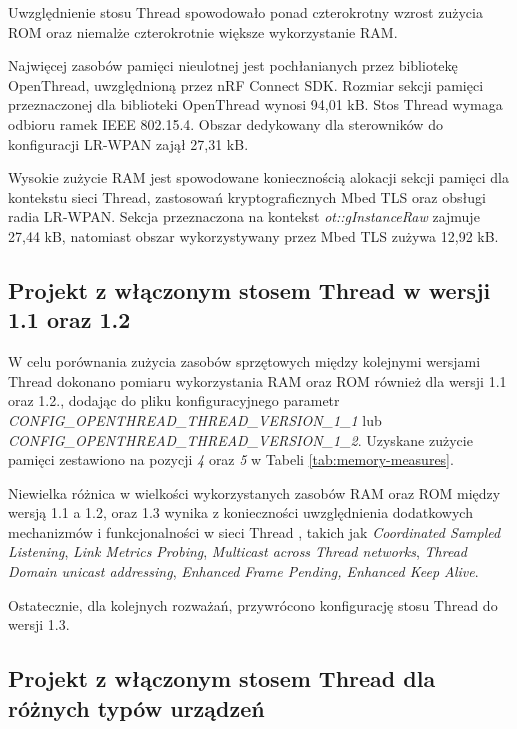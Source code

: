         Uwzględnienie stosu Thread spowodowało ponad czterokrotny wzrost zużycia ROM oraz niemalże czterokrotnie większe wykorzystanie RAM. 
        
        Najwięcej zasobów pamięci nieulotnej jest pochłanianych przez bibliotekę OpenThread, uwzględnioną przez nRF Connect SDK. Rozmiar sekcji pamięci przeznaczonej dla biblioteki OpenThread wynosi 94,01 kB. Stos Thread wymaga odbioru ramek IEEE 802.15.4. Obszar dedykowany dla sterowników do konfiguracji LR-WPAN zajął 27,31 kB.

        Wysokie zużycie RAM jest spowodowane koniecznością alokacji sekcji pamięci dla kontekstu sieci Thread, zastosowań kryptograficznych Mbed TLS oraz obsługi radia LR-WPAN. Sekcja przeznaczona na kontekst \textit{ot::gInstanceRaw} zajmuje 27,44 kB, natomiast obszar wykorzystywany przez Mbed TLS zużywa 12,92 kB.

    \subsection{Projekt z włączonym stosem Thread w wersji 1.1 oraz 1.2}

    W celu porównania zużycia zasobów sprzętowych między kolejnymi wersjami Thread dokonano pomiaru wykorzystania RAM oraz ROM również dla wersji 1.1 oraz 1.2., dodając do pliku konfiguracyjnego parametr \textit{CONFIG\_OPENTHREAD\_THREAD\_VERSION\_1\_1} lub \\ \textit{CONFIG\_OPENTHREAD\_THREAD\_VERSION\_1\_2}. Uzyskane zużycie pamięci zestawiono na pozycji \textit{4} oraz \textit{5} w Tabeli \ref{tab:memory-measures}.

    Niewielka różnica w wielkości wykorzystanych zasobów RAM oraz ROM między wersją 1.1 a 1.2, oraz 1.3 wynika z konieczności uwzględnienia dodatkowych mechanizmów i funkcjonalności w sieci Thread \cite{nrf-thread-version-options}, takich jak \textit{Coordinated Sampled Listening}, \textit{Link Metrics Probing}, \textit{Multicast across Thread networks}, \textit{Thread Domain unicast addressing}, \textit{Enhanced Frame Pending, Enhanced Keep Alive}.

    Ostatecznie, dla kolejnych rozważań, przywrócono konfigurację stosu Thread do wersji 1.3.

    \subsection{Projekt z włączonym stosem Thread dla różnych typów urządzeń}

